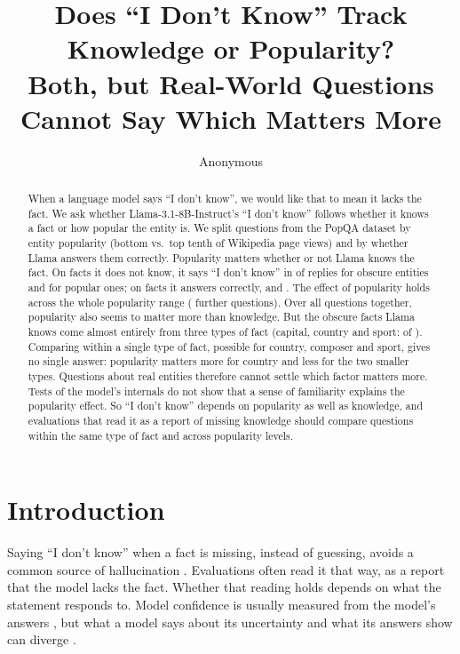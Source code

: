 \documentclass[11pt]{article}
\title{Does ``I Don't Know'' Track Knowledge or Popularity?\\Both, but Real-World Questions Cannot Say Which Matters More}
\author{Anonymous}
\newcommand{\idk}{``I don't know''}
\begin{document}
\maketitle

\begin{abstract}
When a language model says \idk, we would like that to mean it lacks the fact. We ask whether Llama-3.1-8B-Instruct's \idk{} follows whether it knows a fact or how popular the entity is. We split questions from the PopQA dataset by entity popularity (bottom vs.\ top tenth of Wikipedia page views) and by whether Llama answers them correctly. Popularity matters whether or not Llama knows the fact. On facts it does not know, it says \idk{} in \tcObsUnkAbs{} of replies for obscure entities and \tcPopUnkAbs{} for popular ones; on facts it answers correctly, \tcObsKnownAbs{} and \cPopKnownAbs{}. The effect of popularity holds across the whole popularity range (\xtAllN{} further questions). Over all questions together, popularity also seems to matter more than knowledge. But the obscure facts Llama knows come almost entirely from three types of fact (capital, country and sport: \rcTopThree{} of \gsObsKnownTotal). Comparing within a single type of fact, possible for country, composer and sport, gives no single answer: popularity matters more for country and less for the two smaller types. Questions about real entities therefore cannot settle which factor matters more. Tests of the model's internals do not show that a sense of familiarity explains the popularity effect. So \idk{} depends on popularity as well as knowledge, and evaluations that read it as a report of missing knowledge should compare questions within the same type of fact and across popularity levels.
\end{abstract}

\section{Introduction}

Saying \idk{} when a fact is missing, instead of guessing, avoids a common source of hallucination \citep{kalai2025hallucinate}. Evaluations often read it that way, as a report that the model lacks the fact. Whether that reading holds depends on what the statement responds to. Model confidence is usually measured from the model's answers \citep{kadavath2022know,kuhn2023semantic}, but what a model says about its uncertainty and what its answers show can diverge \citep{ji2025hedging}.
\end{document}
